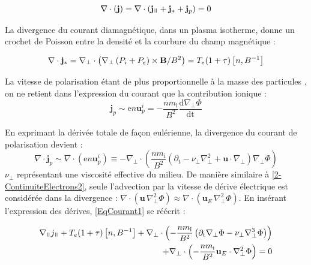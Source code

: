 \begin{refsection}
\begin{equation}
\label{EqCourant1}
\nabla\cdot\left(\mathbf{j}\right) = 
\nabla\cdot\left(\mathbf{j}_\para+\mathbf{j}_*+\mathbf{j}_p\right)
= 0
\end{equation}

La divergence du courant diamagnétique, dans un plasma isotherme, donne un
crochet de Poisson entre la densité et la courbure du champ magnétique :

\begin{equation}
\nabla\cdot\mathbf{j}_*=
\nabla_\perp\cdot\left(\nabla_\perp\left(
P_i+P_e\right)\times\mathbf{B}/B^2\right) =
T_e(1+\tau)\left[n,B^{{-1}}\right]
\end{equation}

La vitesse de polarisation étant de plus
proportionnelle à la masse des particules , on ne
retient dans l'expression du courant que la contribution ionique :
\begin{equation}
\mathbf{j}_p\sim\text{e}n\mathbf{u}^i_p=-\frac{nm_\text{i}}{B^2}\frac{\text{d}\nabla_\perp
\Phi}{\text{dt}}
\end{equation}

En exprimant la dérivée totale de
façon eulérienne, la divergence du courant de polarisation devient :
\begin{equation}
\nabla\cdot\mathbf{j}_p\sim\nabla\cdot\left(\text{e}n\mathbf{u}^i_p\right)\equiv
-\nabla_\perp\cdot\left(\frac{nm_\text{i}}{B^2}\left(\partial_\text{t} -
\nu_\perp \nabla_\perp^2 +
\mathbf{u}\cdot\nabla_\perp\right)\nabla_\perp \Phi\right)
\end{equation}
$\nu_\perp$ représentant une viscosité effective du milieu.
De manière similaire à \eqref{2-ContinuiteElectrons2}, seule l'advection par la
vitesse de dérive électrique est considérée dans la divergence : 
$\nabla\cdot\left(\mathbf{u}\,\nabla_\perp^2 \Phi\right)
\approx\nabla\cdot\left(\mathbf{u}_E\,\nabla_\perp^2 \Phi\right)$.
En insérant l'expression des dérives, \eqref{EqCourant1} se réécrit :

\begin{equation}\begin{split}
\label{EqCourant2}
\nabla_\para j_\para +
T_e(1+\tau)\left[n,B\puissance{-1}\right] + \nabla_\perp\cdot\left(-\frac{nm_\text{i}}{B^2}\left(\partial_\text{t}\nabla_\perp
\Phi - \nu_\perp \nabla_\perp^3 \Phi \right)\right) \\+
\nabla_\perp\cdot\left(-\frac{nm_\text{i}}{B^2}\mathbf{u}_E\cdot\nabla_\perp^2
\Phi\right)=0
\end{split}
\end{equation}


\end{refsection}
